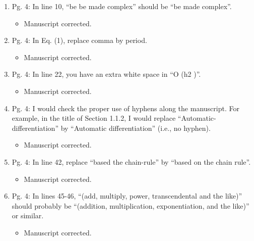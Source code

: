 \documentclass{article}
\begin{document}
\begin{enumerate}
\begin{enumerate}
 \item Pg. 4: In line 10, “be be made complex” should be “be made complex”.

{\color{red}  
\begin{itemize}
     \item
 Manuscript corrected. 
  \end{itemize}}

 \item Pg. 4: In Eq. (1), replace comma by period.

{\color{red}  
\begin{itemize}
     \item
 Manuscript corrected. 
  \end{itemize}}

 \item Pg. 4: In line 22, you have an extra white space in “O (h2 )”.

{\color{red}  
\begin{itemize}
     \item
 Manuscript corrected. 
  \end{itemize}}

 \item Pg. 4: I would check the proper use of hyphens along the manuscript. For example,
in the title of Section 1.1.2, I would replace “Automatic-differentiation” by “Automatic
differentiation” (i.e., no hyphen).

{\color{red}  
\begin{itemize}
     \item
 Manuscript corrected. 
  \end{itemize}}

 \item Pg. 4: In line 42, replace “based the chain-rule” by “based on the chain rule”.

{\color{red}  
\begin{itemize}
     \item
 Manuscript corrected. 
  \end{itemize}}

 \item Pg. 4: In lines 45-46, “(add, multiply, power, transcendental and the like)” should
probably be “(addition, multiplication, exponentiation, and the like)” or similar.

{\color{red}  
\begin{itemize}
     \item
 Manuscript corrected. 
  \end{itemize}}


\end{enumerate}
\end{enumerate}
\end{document}
